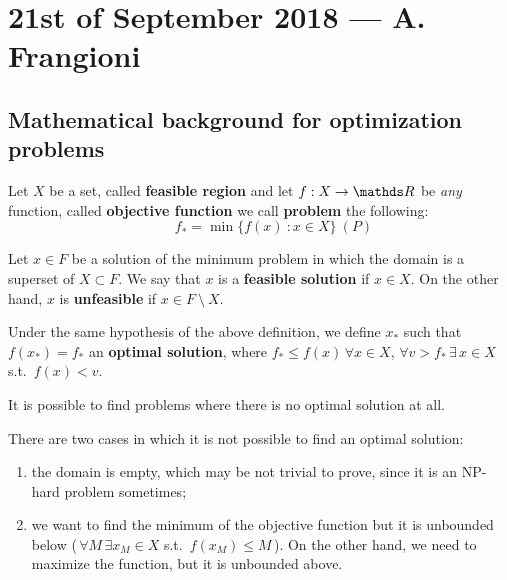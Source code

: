 \documentclass[ComputationalMathematics.tex]{subfiles}
\begin{document}
\section{21st of September 2018 --- A. Frangioni}

\subsection{Mathematical background for optimization problems}

\begin{definition}\label{def:min_prob}
  Let $X$ be a set, called \textbf{feasible region} and let $f : X \to \R$ be \emph{any} function, called \textbf{objective function} we call \textbf{problem} the following:
\[
  \qquad f_* = \min \{f(x)~:x \in X\}~(P)
\]
\end{definition}


\begin{definition}
  Let $x \in F$ be a solution of the minimum problem in which the domain is a superset of $X \subset F$. 
  We say that $x$ is a \textbf{feasible solution} if $x \in X$.
  On the other hand, $x$ is \textbf{unfeasible} if $x \in F~\setminus~X$.
\end{definition}

\begin{definition}
  Under the same hypothesis of the above definition, we define $x_*$ such that $f(x_*) = f_*$ an \textbf{optimal solution}, where $f_* \leq f(x) \, \forall x \in X$, $\forall v > f_* \, \exists \, x \in X$ s.t.~$f(x) < v$.
\end{definition}

It is possible to find problems where there is no optimal solution at all.

\begin{example}
  There are two cases in which it is not possible to find an optimal solution:
  \begin{enumerate}
    \item the domain is empty, which may be not trivial to prove, since it is an NP-hard problem sometimes;
    \item we want to find the minimum of the objective function but it is unbounded below (\,$\forall M \, \exists x_M \in X$
      s.t.~$f(x_M) \leq M$\,).
      On the other hand, we need to maximize the function, but it is unbounded above.
  \end{enumerate}
\end{example}
\end{document}
